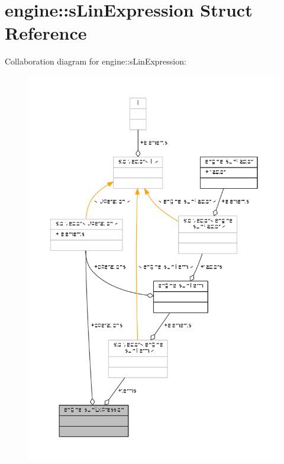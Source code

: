 \hypertarget{structengine_1_1sLinExpression}{\section{engine\-:\-:s\-Lin\-Expression Struct Reference}
\label{structengine_1_1sLinExpression}
}


Collaboration diagram for engine\-:\-:s\-Lin\-Expression\-:
\nopagebreak
\begin{figure}[H]
\begin{center}
\leavevmode
\includegraphics[width=350pt]{structengine_1_1sLinExpression__coll__graph}
\end{center}
\end{figure}
